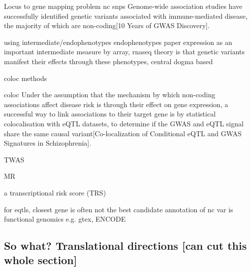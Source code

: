 \begin{outline}

\1 Locus to gene mapping problem
    \2 nc snps
        \3 Genome-wide association studies have successfully identified genetic variants associated with immune-mediated disease, the majority of which are non-coding[10 Years of GWAS Discovery].

\1 using intermediate/endophenotypes
    \2 endophenotypes paper
    \2 expression as an important intermediate
        \3 measure by array, rnaseq 
    \2 theory is that genetic variants manifest their effects through these phenotypes, central dogma based

\1 coloc methods

    \2 coloc
        \3 Under the assumption that the mechanism by which non-coding associations affect disease risk is through their effect on gene expression, a successful way to link associations to their target gene is by statistical colocalisation with eQTL datasets, to determine if the GWAS and eQTL signal share the same causal variant[Co-localization of Conditional eQTL and GWAS Signatures in Schizophrenia].

    \2 TWAS

    \2 MR

    \2 a transcriptional risk score (TRS)

\1 for eqtls, closest gene is often not the best candidate
    \2 annotation of nc var is functional genomics
        \3 e.g. gtex, ENCODE
\end{outline}

\subsection{So what? Translational directions [can cut this whole section]}

